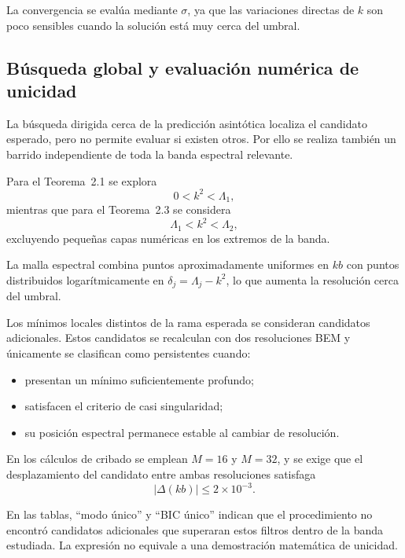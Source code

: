 \documentclass[11pt]{article}
\begin{document}
La convergencia se evalúa mediante \(\sigma\), ya que las variaciones directas de \(k\) son poco sensibles cuando la solución está muy cerca del umbral.

\subsection{Búsqueda global y evaluación numérica de unicidad}

La búsqueda dirigida cerca de la predicción asintótica localiza el candidato esperado, pero no permite evaluar si existen otros. Por ello se realiza también un barrido independiente de toda la banda espectral relevante.

Para el Teorema~2.1 se explora
\begin{equation}
0<k^2<\Lambda_1,
\end{equation}
mientras que para el Teorema~2.3 se considera
\begin{equation}
\Lambda_1<k^2<\Lambda_2,
\end{equation}
excluyendo pequeñas capas numéricas en los extremos de la banda.

La malla espectral combina puntos aproximadamente uniformes en \(kb\) con puntos distribuidos logarítmicamente en
\(\delta_j=\Lambda_j-k^2\), lo que aumenta la resolución cerca del umbral.

Los mínimos locales distintos de la rama esperada se consideran candidatos adicionales. Estos candidatos se recalculan con dos resoluciones BEM y únicamente se clasifican como persistentes cuando:

\begin{itemize}
    \item presentan un mínimo suficientemente profundo;
    \item satisfacen el criterio de casi singularidad;
    \item su posición espectral permanece estable al cambiar de resolución.
\end{itemize}

En los cálculos de cribado se emplean \(M=16\) y \(M=32\), y se exige que el desplazamiento del candidato entre ambas resoluciones satisfaga
\begin{equation}
|\Delta(kb)|\leq2\times10^{-3}.
\end{equation}

En las tablas, ``modo único'' y ``BIC único'' indican que el procedimiento no encontró candidatos adicionales que superaran estos filtros dentro de la banda estudiada. La expresión no equivale a una demostración matemática de unicidad.
\end{document}
